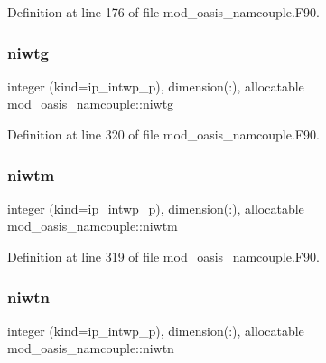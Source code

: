 Definition at line 176 of file mod\+\_\+oasis\+\_\+namcouple.\+F90.

\mbox{\label{namespacemod__oasis__namcouple_a28e887d61cc4b10c00c33a7d0f51a275}} 
\subsubsection{\texorpdfstring{niwtg}{niwtg}}
{\footnotesize\ttfamily integer (kind=ip\+\_\+intwp\+\_\+p), dimension(\+:), allocatable mod\+\_\+oasis\+\_\+namcouple\+::niwtg\hspace{0.3cm}{\ttfamily [private]}}



Definition at line 320 of file mod\+\_\+oasis\+\_\+namcouple.\+F90.

\mbox{\label{namespacemod__oasis__namcouple_a90e4ce86f77bf89c71a9277ff9b5dcbb}} 
\subsubsection{\texorpdfstring{niwtm}{niwtm}}
{\footnotesize\ttfamily integer (kind=ip\+\_\+intwp\+\_\+p), dimension(\+:), allocatable mod\+\_\+oasis\+\_\+namcouple\+::niwtm\hspace{0.3cm}{\ttfamily [private]}}



Definition at line 319 of file mod\+\_\+oasis\+\_\+namcouple.\+F90.

\mbox{\label{namespacemod__oasis__namcouple_a63c2f2977f9cc4839f6bdec7bbbc5fa7}} 
\subsubsection{\texorpdfstring{niwtn}{niwtn}}
{\footnotesize\ttfamily integer (kind=ip\+\_\+intwp\+\_\+p), dimension(\+:), allocatable mod\+\_\+oasis\+\_\+namcouple\+::niwtn\hspace{0.3cm}{\ttfamily [private]}}



